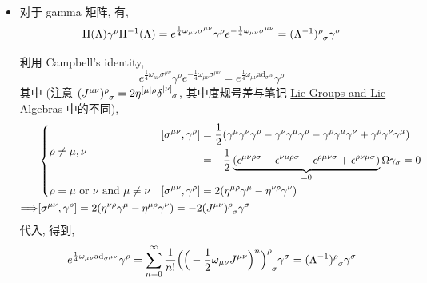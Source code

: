 \begin{itemize}
	\noindent\rule[0.5ex]{\linewidth}{0.5pt} %
	
	\item 对于 gamma 矩阵, 有,
	\begin{equation}
		\Pi(\Lambda) \gamma^\rho \Pi^{- 1}(\Lambda) = e^{\frac{1}{4} \omega_{\mu \nu} \sigma^{\mu \nu}} \gamma^\rho e^{- \frac{1}{4} \omega_{\mu \nu} \sigma^{\mu \nu}} = \tensor{(\Lambda^{- 1})}{^\rho_\sigma} \gamma^\sigma
	\end{equation}
	
	\begin{tcolorbox}[title=calculation:]
		利用 Campbell's identity,
		\begin{equation}
			e^{\frac{1}{4} \omega_{\mu \nu} \sigma^{\mu \nu}} \gamma^\rho e^{- \frac{1}{4} \omega_{\mu \nu} \sigma^{\mu \nu}} = e^{\frac{1}{4} \omega_{\mu \nu} \mathrm{ad}_{\sigma^{\mu \nu}}} \gamma^\rho
		\end{equation}
		其中 (注意 $\tensor{(J^{\mu \nu})}{^\rho_\sigma} = 2 \eta^{[\mu| \rho} \tensor{\delta}{^{|\nu]}_\sigma}$, 其中度规号差与笔记 \href{https://github.com/siyang03/my-note---Lie-Groups-and-Lie-Algebras}{Lie Groups and Lie Algebras} 中的不同),
			\begin{align}
			& \begin{dcases}
				\rho \neq \mu, \nu & \begin{aligned}
					[\sigma^{\mu \nu}, \gamma^\rho] &= \frac{1}{2} (\gamma^\mu \gamma^\nu \gamma^\rho - \gamma^\nu \gamma^\mu \gamma^\rho - \gamma^\rho \gamma^\mu \gamma^\nu + \gamma^\rho \gamma^\nu \gamma^\mu) \\
					&= - \frac{1}{2} \underbrace{(\epsilon^{\mu \nu \rho \sigma} - \epsilon^{\nu \mu \rho \sigma} - \epsilon^{\rho \mu \nu \sigma} + \epsilon^{\rho \nu \mu \sigma})}_{= 0} \Omega \gamma_\sigma = 0
				\end{aligned} \\
				\rho = \mu \ \text{or} \ \nu \ \text{and} \ \mu \neq \nu & [\sigma^{\mu \nu}, \gamma^\rho] = 2 (\eta^{\mu \rho} \gamma^\mu - \eta^{\nu \rho} \gamma^\nu)
			\end{dcases} \notag \\
			\Longrightarrow & [\sigma^{\mu \nu}, \gamma^\rho] = 2 (\eta^{\nu \rho} \gamma^\mu - \eta^{\mu \rho} \gamma^\nu) = - 2 \tensor{(J^{\mu \nu})}{^\rho_\sigma} \gamma^\sigma
		\end{align}
		代入, 得到,
		\begin{equation}
			e^{\frac{1}{4} \omega_{\mu \nu} \mathrm{ad}_{\sigma^{\mu \nu}}} \gamma^\rho = \sum_{n = 0}^\infty \frac{1}{n!} \tensor{\Big( \Big( - \frac{1}{2} \omega_{\mu \nu} J^{\mu \nu} \Big)^n \Big)}{^\rho_\sigma} \gamma^\sigma = \tensor{(\Lambda^{- 1})}{^\rho_\sigma} \gamma^\sigma
		\end{equation}
	\end{tcolorbox}
	

\end{itemize}
